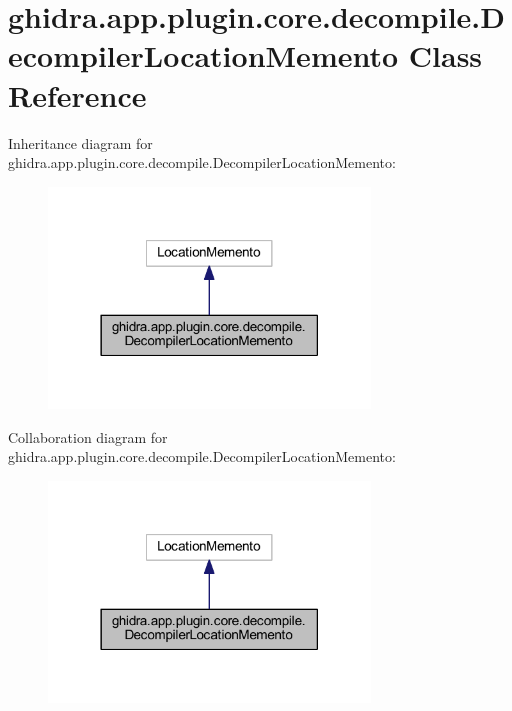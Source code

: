 \hypertarget{classghidra_1_1app_1_1plugin_1_1core_1_1decompile_1_1_decompiler_location_memento}{}\section{ghidra.\+app.\+plugin.\+core.\+decompile.\+Decompiler\+Location\+Memento Class Reference}
\label{classghidra_1_1app_1_1plugin_1_1core_1_1decompile_1_1_decompiler_location_memento}


Inheritance diagram for ghidra.\+app.\+plugin.\+core.\+decompile.\+Decompiler\+Location\+Memento\+:
\nopagebreak
\begin{figure}[H]
\begin{center}
\leavevmode
\includegraphics[width=242pt]{classghidra_1_1app_1_1plugin_1_1core_1_1decompile_1_1_decompiler_location_memento__inherit__graph}
\end{center}
\end{figure}


Collaboration diagram for ghidra.\+app.\+plugin.\+core.\+decompile.\+Decompiler\+Location\+Memento\+:
\nopagebreak
\begin{figure}[H]
\begin{center}
\leavevmode
\includegraphics[width=242pt]{classghidra_1_1app_1_1plugin_1_1core_1_1decompile_1_1_decompiler_location_memento__coll__graph}
\end{center}
\end{figure}
